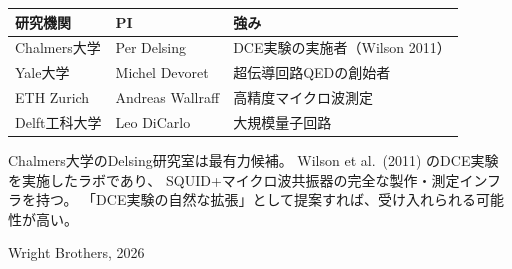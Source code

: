 \documentclass[12pt,a4paper]{article}
\begin{document}
\begin{table}[h]
\centering
\small
\begin{tabular}{@{}lll@{}}
\toprule
研究機関 & PI & 強み \\
\midrule
Chalmers大学 & Per Delsing & DCE実験の実施者（Wilson 2011） \\
Yale大学 & Michel Devoret & 超伝導回路QEDの創始者 \\
ETH Zurich & Andreas Wallraff & 高精度マイクロ波測定 \\
Delft工科大学 & Leo DiCarlo & 大規模量子回路 \\
\bottomrule
\end{tabular}
\end{table}

\begin{checkbox}
Chalmers大学のDelsing研究室は最有力候補。
Wilson et al.\ (2011) のDCE実験を実施したラボであり、
SQUID+マイクロ波共振器の完全な製作・測定インフラを持つ。
「DCE実験の自然な拡張」として提案すれば、受け入れられる可能性が高い。
\end{checkbox}

\vfill
\begin{center}
{\small Wright Brothers, 2026}
\end{center}
\end{document}

